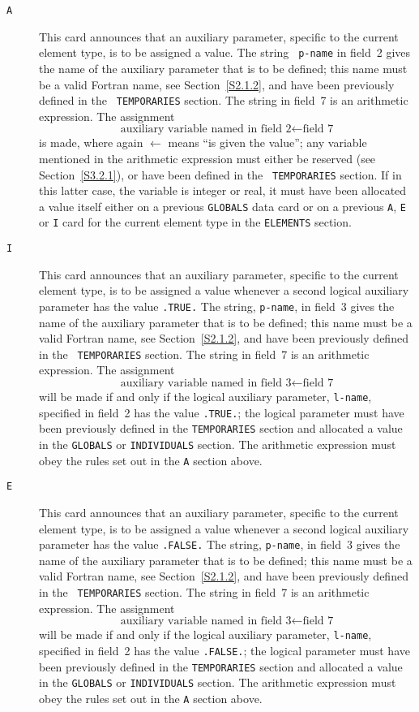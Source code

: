 \documentclass[a4paper]{article}
\newcommand{\itt}[1]{\item[\tt #1]}
\newcommand{\bdmath}{\begin{displaymath}}
\newcommand{\edmath}{\end{displaymath}}
\begin{document}
\begin{description}
\itt{A}
This  card
announces that  an  auxiliary  parameter, specific   to the
current element type,
is to be assigned  a  value.   The string {\tt
p-name} in field~2 gives the name of the auxiliary parameter that is
to  be  defined;   this name   must  be  a valid Fortran   name,   see
Section~\ref{S2.1.2},  and have been  previously  defined in the  {\tt
TEMPORARIES}
section.    The  string in  field~7  is   an  arithmetic
expression.  The assignment
\bdmath
\mbox{auxiliary variable named in field~2} \leftarrow \mbox{field~7}
\edmath
is made,  where again $\leftarrow$  means ``is  given the value''; any
variable  mentioned  in   the arithmetic  expression  must  either  be
reserved (see Section~\ref{S3.2.1}), or  have been defined in the {\tt
TEMPORARIES}
section. If in this latter  case, the variable is integer
or real,  it  must have  been allocated a   value itself either   on a
previous {\tt GLOBALS}
data card
or on a previous {\tt A}, {\tt  E} or
{\tt I}  card  for the   current element type
in the   {\tt ELEMENTS}
section.

\itt{I}
This card   announces that an   auxiliary parameter,  specific  to the
current element type,
is  to be  assigned  a  value whenever  a second
logical auxiliary
parameter has  the  value {\tt  .TRUE.} The  string,
{\tt p-name}, in field~3 gives  the name of  the  auxiliary parameter
that is to  be defined; this  name must be  a valid Fortran  name,
see Section~\ref{S2.1.2}, and have been previously defined in the {\tt
TEMPORARIES}
section.  The string  in field~7  is  an  arithmetic expression.   The
assignment
\bdmath
\mbox{auxiliary variable  named in field~3} \leftarrow \mbox{field~7}
\edmath
will  be made if  and only  if the logical  auxiliary parameter,
{\tt l-name}, specified in field~2 has the value {\tt .TRUE.};  the logical
parameter must have been previously defined in the {\tt TEMPORARIES}
section   and  allocated  a  value  in the   {\tt  GLOBALS}
or  {\tt INDIVIDUALS}
section.  The arithmetic expression must obey the rules set out in the
{\tt A}
section above.

\itt{E}
This card
announces  that  an auxiliary  parameter,  specific to  the
current element type,
is  to be  assigned a  value  whenever a  second
logical  auxiliary
parameter has the value  {\tt .FALSE.} The  string,
{\tt p-name},  in field~3 gives  the name of  the auxiliary parameter
that is to be defined; this  name must  be  a  valid Fortran name, see
Section~\ref{S2.1.2}, and have been  previously defined  in  the  {\tt
TEMPORARIES}
section.   The  string   in  field~7 is   an arithmetic
expression.  The assignment
\bdmath
\mbox{auxiliary variable named in field~3} \leftarrow \mbox{field~7}
\edmath
will be made  if and only if  the   logical auxiliary parameter,
{\tt l-name}, specified in field~2 has the value {\tt .FALSE.}; the logical
parameter must have  been previously defined  in the {\tt TEMPORARIES}
section   and   allocated  a value  in   the   {\tt   GLOBALS}
or {\tt INDIVIDUALS}
section.  The arithmetic expression must obey the rules set out in the
{\tt A}
section above.


\end{description}
\end{document}
